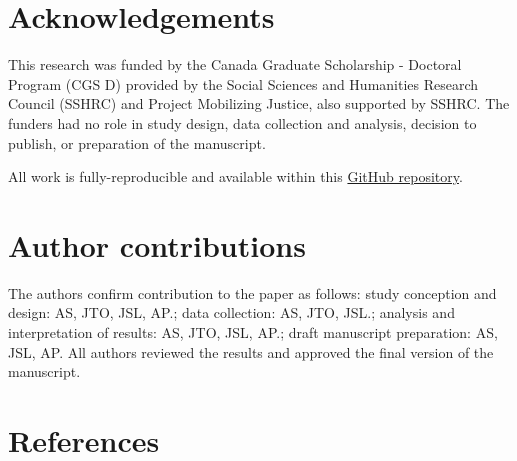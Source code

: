 \documentclass[10pt,letterpaper]{article}
\begin{document}
\hypertarget{acknowledgements}{%
\section{Acknowledgements}\label{acknowledgements}}

This research was funded by the Canada Graduate Scholarship - Doctoral
Program (CGS D) provided by the Social Sciences and Humanities Research
Council (SSHRC) and Project Mobilizing Justice, also supported by SSHRC.
The funders had no role in study design, data collection and analysis,
decision to publish, or preparation of the manuscript.

All work is fully-reproducible and available within this
\href{https://github.com/soukhova/Multimodal-spatial-availability}{GitHub
repository}.

\hypertarget{author-contributions}{%
\section{Author contributions}\label{author-contributions}}

The authors confirm contribution to the paper as follows: study
conception and design: AS, JTO, JSL, AP.; data collection: AS, JTO,
JSL.; analysis and interpretation of results: AS, JTO, JSL, AP.; draft
manuscript preparation: AS, JSL, AP. All authors reviewed the results
and approved the final version of the manuscript.

\hypertarget{references}{%
\section*{References}\label{references}}
\end{document}
